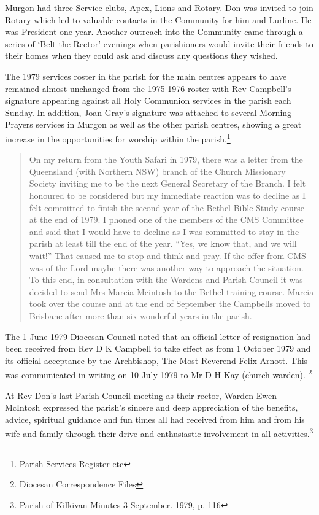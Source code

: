 Murgon had three Service clubs, Apex, Lions and Rotary. Don was invited
to join Rotary which led to valuable contacts in the Community for him
and Lurline. He was President one year. Another outreach into the
Community came through a series of `Belt the Rector' evenings when
parishioners would invite their friends to their homes when they could
ask and discuss any questions they wished.

The 1979 services roster in the parish for the main centres appears to
have remained almost unchanged from the 1975-1976 roster with Rev
Campbell's signature appearing against all Holy Communion services in
the parish each Sunday. In addition, Joan Gray's signature was attached
to several Morning Prayers services in Murgon as well as the other
parish centres, showing a great increase in the opportunities for
worship within the parish.\footnote{Parish Services Register etc}

\begin{quote}
On my return from the Youth Safari in 1979, there was a letter from the
Queensland (with Northern NSW) branch of the Church Missionary Society
inviting me to be the next General Secretary of the Branch. I felt
honoured to be considered but my immediate reaction was to decline as I
felt committed to finish the second year of the Bethel Bible Study
course at the end of 1979. I phoned one of the members of the CMS
Committee and said that I would have to decline as I was committed to
stay in the parish at least till the end of the year. ``Yes, we know
that, and we will wait!'' That caused me to stop and think and pray. If
the offer from CMS was of the Lord maybe there was another way to
approach the situation. To this end, in consultation with the Wardens
and Parish Council it was decided to send Mrs Marcia Mcintosh to the
Bethel training course. Marcia took over the course and at the end of
September the Campbells moved to Brisbane after more than six wonderful
years in the parish.
\end{quote}

The 1 June 1979 Diocesan Council noted that an official letter of
resignation had been received from Rev D K Campbell to take effect as
from 1 October 1979 and its official acceptance by the Archbishop, The
Most Reverend Felix Arnott. This was communicated in writing on 10 July
1979 to Mr D H Kay (church warden). \footnote{Diocesan Correspondence
  Files}

At Rev Don's last Parish Council meeting as their rector, Warden Ewen
McIntosh expressed the parish's sincere and deep appreciation of the
benefits, advice, spiritual guidance and fun times all had received from
him and from his wife and family through their drive and enthusiastic
involvement in all activities.\footnote{Parish of Kilkivan Minutes 3
  September. 1979, p. 116}

